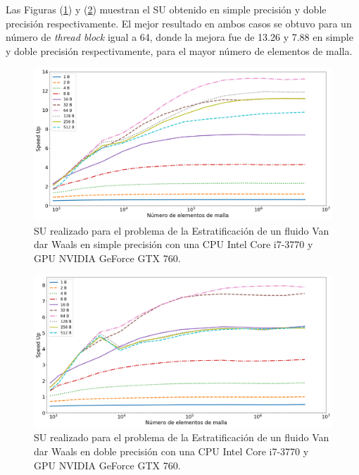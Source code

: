 Las Figuras (\ref{fig:s_760_VdW_simple_10}) y (\ref{fig:s_760_VdW_double_10}) muestran el SU obtenido en simple precisión y doble precisión respectivamente. El mejor resultado en ambos casos se obtuvo para un número de \textit{thread block} igual a 64, donde la mejora fue de 13.26 y 7.88 en simple y doble precisión respectivamente, para el mayor número de elementos de malla.



\begin{figure}[htbp]
	\centering
	\includegraphics[width=\textwidth]{figs/cap4/s_760_VdW_simple_10}
	\caption{SU realizado para el problema de la Estratificación de un fluido Van dar Waals en simple precisión con una CPU Intel Core i7-3770 y GPU NVIDIA GeForce GTX 760.} 
	\label{fig:s_760_VdW_simple_10}	
\end{figure}

\begin{figure}[htbp]
	\centering
	\includegraphics[width=\textwidth]{figs/cap4/s_760_VdW_double_10}
	\caption{SU realizado para el problema de la Estratificación de un fluido Van dar Waals en doble precisión con una CPU Intel Core i7-3770 y GPU NVIDIA GeForce GTX 760.} 
	\label{fig:s_760_VdW_double_10}	
\end{figure}

